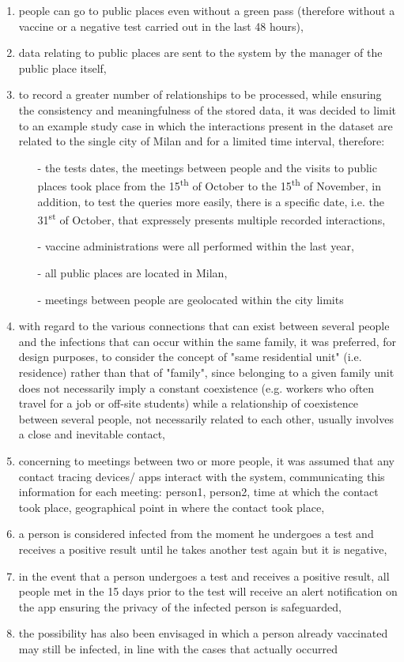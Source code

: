 \documentclass[a4paper,12pt]{article}
\begin{document}
  \begin{enumerate}[noitemsep]
    \item people can go to public places even without a green pass (therefore without a vaccine or a negative test carried out in the last 48 hours),
    \item data relating to public places are sent to the system by the manager of the public place itself,
    \item to record a greater number of relationships to be processed, while ensuring the consistency and meaningfulness of the stored data, it was decided to limit to an example study case in which the interactions present in the dataset are related to the single city of Milan and for a limited time interval, therefore:
  \begin{itemize}[noitemsep]
    \item[-] the tests dates, the meetings between people and the visits to public places took place from the 15\textsuperscript{th} of October to the 15\textsuperscript{th} of November, in addition, to test the queries more easily, there is a specific date, i.e. the 31\textsuperscript{st} of October, that expressely presents multiple recorded interactions,
    \item[-] vaccine administrations were all performed within the last year,
    \item[-] all public places are located in Milan,
    \item[-] meetings between people are geolocated within the city limits
  \end{itemize}
    \item with regard to the various connections that can exist between several people and the infections that can occur within the same family, it was preferred, for design purposes, to consider the concept of "same residential unit" (i.e. residence) rather than that of "family", since belonging to a given family unit does not necessarily imply a constant coexistence (e.g. workers who often travel for a job or off-site students) while a relationship of coexistence between several people, not necessarily related to each other, usually involves a close and inevitable contact,
    \item concerning to meetings between two or more people, it was assumed that any contact tracing devices/ apps interact with the system, communicating this information for each meeting: person1, person2, time at which the contact took place, geographical point in where the contact took place,
    \item a person is considered infected from the moment he undergoes a test and receives a positive result until he takes another test again but it is negative,
    \item in the event that a person undergoes a test and receives a positive result, all people met in the 15 days prior to the test will receive an alert notification on the app ensuring the privacy of the infected person is safeguarded,
    \item the possibility has also been envisaged in which a person already vaccinated may still be infected, in line with the cases that actually occurred
  \end{enumerate}
\clearpage
\end{document}
